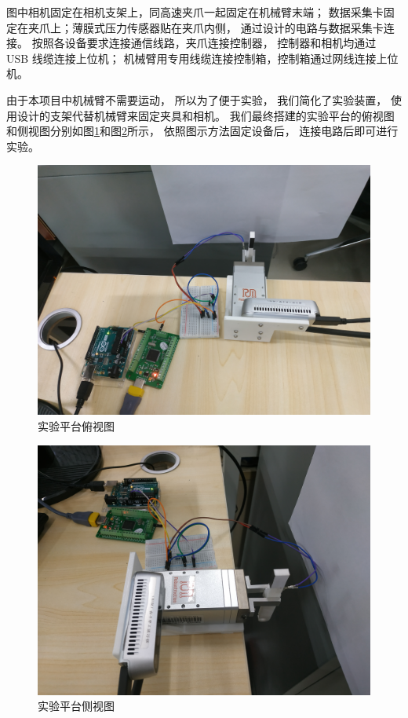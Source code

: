 图中相机固定在相机支架上，同高速夹爪一起固定在机械臂末端；
数据采集卡固定在夹爪上；薄膜式压力传感器贴在夹爪内侧，
通过设计的电路与数据采集卡连接。
按照各设备要求连接通信线路，夹爪连接控制器，
控制器和相机均通过 USB 线缆连接上位机；
机械臂用专用线缆连接控制箱，控制箱通过网线连接上位机。

由于本项目中机械臂不需要运动， 所以为了便于实验， 我们简化了实验装置，
使用设计的支架代替机械臂来固定夹具和相机。
我们最终搭建的实验平台的俯视图和侧视图分别如图\ref{fig:exp-1}和图\ref{fig:exp-2}所示，
依照图示方法固定设备后， 连接电路后即可进行实验。

\begin{figure}[!ht]
  \centering
  \includegraphics[width=11.3cm]{chapter04/pic/exp-1}
  \caption{\label{fig:exp-1}
    实验平台俯视图}
  \vspace{-0.3cm}
\end{figure}

\begin{figure}[!ht]
  \centering
  \includegraphics[width=11.3cm]{chapter04/pic/exp-2}
  \caption{\label{fig:exp-2}
    实验平台侧视图}
  \vspace{-0.3cm}
\end{figure}

